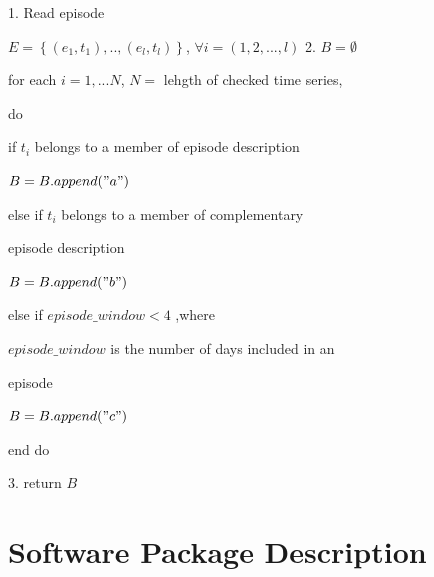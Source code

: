 \documentclass[10pt, conference, compsocconf]{IEEEtran}
\begin{document}
\vspace{1.2mm}
\par
1. Read episode 
\par\quad $E=\left \{ (e_{1},t_{1}),..,(e_{l},t_{l}) \right \}$, $\forall i=(1,2,...,l)$
2. $B=\emptyset$
\par\quad for each $i=1,...N$, $N=$ lehgth of checked time series, 
\par\quad do
\par\quad if $t_{i}$ belongs to a member of episode description
\par\quad $B=B.append("a")$
\par\quad else if $t_{i}$ belongs to a member of complementary 
\par\quad episode description
\par\quad $B=B.append("b")$
\par\quad else if $episode\_window<4$ ,where
\par\quad $episode\_window$ is the number of days included in an 
\par\quad episode
\par\quad $B=B.append("c")$
\par\quad end do
\par
3. return $B$
\vspace{0.6mm}
\par


\section{Software Package Description}
\end{document}
